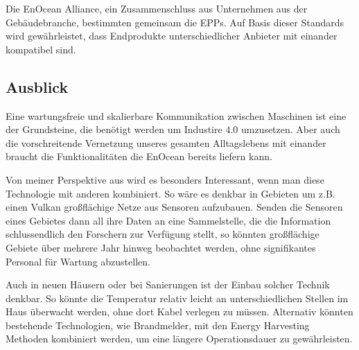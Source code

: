 \begin{multicols}{3}
Die EnOcean Alliance, ein Zusammenschluss aus Unternehmen aus der Gebäudebranche, bestimmten gemeinsam die EPPs. Auf Basis dieser Standards wird gewährleistet, dass Endprodukte unterschiedlicher Anbieter mit einander kompatibel sind. 

\subsection*{Ausblick}
Eine wartungsfreie und skalierbare Kommunikation zwischen Maschinen ist eine der Grundsteine, die benötigt werden um Industire 4.0 umzusetzen. Aber auch die vorschreitende Vernetzung unseres gesamten Alltagslebens mit einander braucht die Funktionalitäten die EnOcean bereits liefern kann. 

Von meiner Perspektive aus wird es besonders Interessant, wenn man diese Technologie mit anderen kombiniert. So wäre es denkbar in Gebieten um z.B. einen Vulkan großflächige Netze aus Sensoren aufzubauen. Senden die Sensoren eines Gebietes dann all ihre Daten an eine Sammelstelle, die die Information schlussendlich den Forschern zur Verfügung stellt, so könnten großflächige Gebiete über mehrere Jahr hinweg beobachtet werden, ohne signifikantes Personal für Wartung abzustellen.

Auch in neuen Häusern oder bei Sanierungen ist der Einbau solcher Technik denkbar. So könnte die Temperatur relativ leicht an unterschiedlichen Stellen im Haus überwacht werden, ohne dort Kabel verlegen zu müssen. Alternativ könnten bestehende Technologien, wie Brandmelder, mit den Energy Harvesting Methoden kombiniert werden, um eine längere Operationsdauer zu gewährleisten.

\printbibliography[segment=17,heading=subbibliography]
\end{multicols}
\newpage
